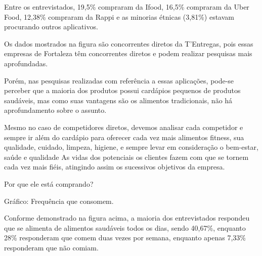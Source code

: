 Entre os entrevistados, 19,5\% compraram da Ifood, 16,5\% compraram da Uber Food, 12,38\% compraram da Rappi e as minorias étnicas (3,81\%) estavam procurando outros aplicativos.\par

Os dados mostrados na figura são concorrentes diretos da T'Entregas, pois essas empresas de Fortaleza têm concorrentes diretos e podem realizar pesquisas mais aprofundadas.\par

Porém, nas pesquisas realizadas com referência a essas aplicações, pode-se perceber que a maioria dos produtos possui cardápios pequenos de produtos saudáveis, mas como suas vantagens são os alimentos tradicionais, não há aprofundamento sobre o assunto.\par

Mesmo no caso de competidores diretos, devemos analisar cada competidor e sempre ir além do cardápio para oferecer cada vez mais alimentos fitness, sua qualidade, cuidado, limpeza, higiene, e sempre levar em consideração o bem-estar, saúde e qualidade As vidas dos potenciais os clientes fazem com que se tornem cada vez mais fiéis, atingindo assim os sucessivos objetivos da empresa.\par

\begin{commentA} \vspace{0.3cm} \noindent Por que ele está comprando? \par \vspace{0.1cm} \end{commentA}

\begin{commentB}
Gráfico: Frequência que consomem.
\par \end{commentB}


Conforme demonstrado na figura acima, a maioria dos entrevistados respondeu que se alimenta de alimentos saudáveis todos os dias, sendo 40,67\%, enquanto 28\% responderam que comem duas vezes por semana, enquanto apenas 7,33\% responderam que não comiam.\par

